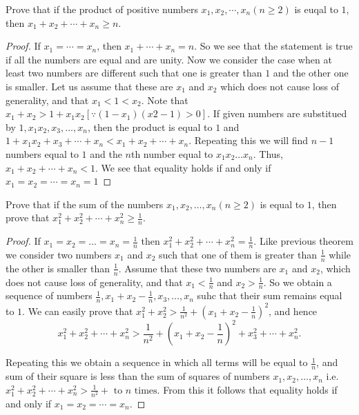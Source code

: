 \begin{theorem}
\label{th:strum:1}
Prove that if the product of positive numbers $x_1, x_2, \cdots, x_n (n\geq 2)$ is euqal to $1$, then $x_1 + x_2 + \cdots + x_n\geq n$.
\end{theorem}
\begin{proof}
  If $x_1 = \cdots = x_n$, then $x_1 + \cdots + x_n = n$. So we see that the statement is true if all the numbers are equal and are
  unity. Now we consider the case when at least two numbers are different such that one is greater than $1$ and the other one is
  smaller. Let us assume that these are $x_1$ and $x_2$ which does not cause loss of generality, and that $x_1 < 1 < x_2$. Note
  that $x_1 + x_2 > 1 + x_1x_2 [\because (1 - x_1)(x2 - 1) > 0]$. If given numbers are substitued by $1, x_1x_2, x_3, \ldots, x_n$,
  then the product is equal to $1$ and $1 + x_1x_2 + x_3 + \cdots + x_n < x_1 + x_2 + \cdots + x_n$. Repeating this we will find $n
  - 1$ numbers equal to $1$ and the $n$th number equal to $x_1x_2\ldots x_n$. Thus, $x_1 + x_2 + \cdots + x_n < 1$. We see that
  equality holds if and only if $x_1 = x_2 = \cdots = x_n = 1$
\end{proof}

\begin{theorem}
\label{th:strum:2}
  Prove that if the sum of the numbers $x_1, x_2, \ldots, x_n (n\geq 2)$ is equal to $1$, then prove that $x_1^2 + x_2^2 + \cdots +
  x_n^2 \geq \frac{1}{n}$.
\end{theorem}
\begin{proof}
  If $x_1 = x_2 = \ldots = x_n = \frac{1}{n}$ then $x_1^2 + x_2^2 + \cdots + x_n^2 = \frac{1}{n}$. Like previous theorem we
  consider two numbers $x_1$ and $x_2$ such that one of them is greater than $\frac{1}{n}$ while the other is smaller than
  $\frac{1}{n}$. Assume that these two numbers are $x_1$ and $x_2$, which does not cause loss of generality, and that $x_1 <
  \frac{1}{n}$ and $x_2 > \frac{1}{n}$. So we obtain a sequence of numbers $\frac{1}{n}, x_1 + x_2 - \frac{1}{n}, x_3, \ldots, x_n$
  suhc that their sum remains equal to $1$. We can easily prove that $x_1^2 + x_2^2 > \frac{1}{n^2} + \left(x_1 + x_2 -
  \frac{1}{n}\right)^2$, and hence $$x_1^2 + x_2^2 + \cdots + x_n^2 > \frac{1}{n^2} + \left(x_1 + x_2 - \frac{1}{n}\right)^2 +
  x_3^2 + \cdots + x_n^2.$$

  Repeating this we obtain a sequence in which all terms will be equal to $\frac{1}{n}$, and sum of their square is less than the
  sum of squares of numbers $x_1, x_2, \ldots, x_n$ i.e. $x_1^2 + x_2^2 + \cdots + x_n^2 > \frac{1}{n^2} +
  \text{~to~}n\text{~times}$. From this it follows that equality holds if and only if $x_1 = x_2 = \cdots = x_n$.
\end{proof}

